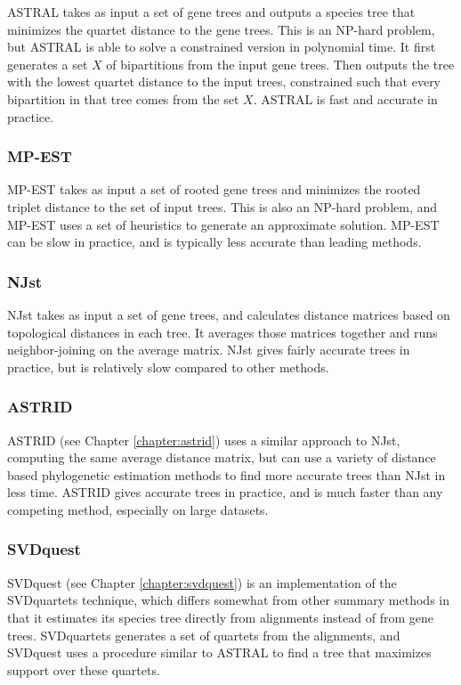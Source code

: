 \documentclass[edeposit,fullpage]{uiucthesis2014}
\theoremstyle{definition}
\begin{document}
ASTRAL takes as input a set of gene trees and outputs a species tree that minimizes the quartet distance to the gene trees. This is an NP-hard problem, but ASTRAL is able to solve a constrained version in polynomial time. It first generates a set $X$ of bipartitions from the input gene trees. Then outputs the tree with the lowest quartet distance to the input trees, constrained such that every bipartition in that tree comes from the set $X$. ASTRAL is fast and accurate in practice.

\subsubsection{MP-EST}

MP-EST takes as input a set of rooted gene trees and minimizes the rooted triplet distance to the set of input trees. This is also an NP-hard problem, and MP-EST uses a set of heuristics to generate an approximate solution. MP-EST can be slow in practice, and is typically less accurate than leading methods.

\subsubsection{NJst}

NJst takes as input a set of gene trees, and calculates distance matrices based on topological distances in each tree. It averages those matrices together and runs neighbor-joining on the average matrix. NJst gives fairly accurate trees in practice, but is relatively slow compared to other methods.

\subsubsection{ASTRID}

ASTRID (see Chapter \ref{chapter:astrid}) uses a similar approach to NJst, computing the same average distance matrix, but can use a variety of distance based phylogenetic estimation methods to find more accurate trees than NJst in less time. ASTRID gives accurate trees in practice, and is much faster than any competing method, especially on large datasets.

\subsubsection{SVDquest}

SVDquest (see Chapter \ref{chapter:svdquest}) is an implementation of the SVDquartets technique, which differs somewhat from other summary methods in that it estimates its species tree directly from alignments instead of from gene trees. SVDquartets generates a set of quartets from the alignments, and SVDquest uses a procedure similar to ASTRAL to find a tree that maximizes support over these quartets.
\end{document}
